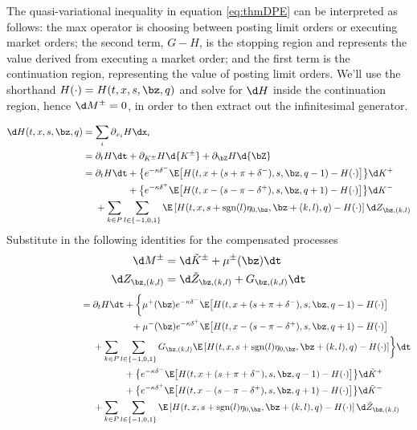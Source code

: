 \documentclass[12pt]{article}
\begin{document}
The quasi-variational inequality in equation \ref{eq:thmDPE} can be interpreted as follows: the max operator is choosing between posting limit orders or executing market orders; the second term, $G-H$, is the stopping region and represents the value derived from executing a market order; and the first term is the continuation region, representing the value of posting limit orders. We'll use the shorthand $H(\cdot) = H(t,x,s,\bz,q)$ and solve for $\d H$ inside the continuation region, hence $\d M^{\pm} = 0$, in order to then extract out the infinitesimal generator.

\begin{align*}
\d H (t,x,s,\bz,q) & = \sum\limits_i \partial_{x_i} H \dx_i \\
& = \partial_t H \dt + \partial_{K^{\pm}} H \d {K^{\pm}} + \partial_{\bZ} H \d {\bZ} \\
& = \partial_t H \dt + \bigl\lbrace e^{ -\kappa \delta^{-}} \E \bigl[ H(t,x+(s+\pi+\delta^-),s,\bz,q-1) - H(\cdot) \bigr] \bigr\rbrace \d K^+\\
& \hphantom{{}={} \partial_t H \dt} + \bigl\lbrace e^{ -\kappa \delta^{+}} \E \bigl[ H(t,x-(s-\pi-\delta^+),s,\bz,q+1) - H(\cdot) \bigr] \bigr\rbrace \d K^-\\
& \hphantom{{}={}} + \sum_{k\in P} \sum_{l \in \{-1,0,1\}} \E \left[ H(t,x,s+\mathrm{sgn}(l)\eta_{0,\bz},\bz+(k,l),q) - H(\cdot) \right] \d Z_{\bz,(k,l)}
\end{align*}
Substitute in the following identities for the compensated processes
\begin{align*} 
\d M^{\pm} & = \d \tilde{K}^{\pm} + \mu^{\pm}(\bz) \dt \\
\d Z_{\bz,(k,l)}  & = \d \tilde{Z}_{\bz,(k,l)}  + G_{\bz,(k,l)} \dt 
\end{align*}
\begin{align*}
{}\phantom{\d H (t,x,s,\bz,q)} & = \partial_t H \dt + \biggl\lbrace \mu^+(\bz) e^{ -\kappa \delta^{-}} \E \bigl[ H(t,x+(s+\pi+\delta^-),s,\bz,q-1) - H(\cdot) \bigr] \\
& \hphantom{{}={} \partial_t H \dt +} + \mu^-(\bz) e^{ -\kappa \delta^{+}} \E \bigl[ H(t,x-(s-\pi-\delta^+),s,\bz,q+1) - H(\cdot) \bigr] \\
& \hphantom{{}={}} + \sum_{k\in P} \sum_{l \in \{-1,0,1\}} G_{\bz,(k,l)} \E \left[ H(t,x,s+\mathrm{sgn}(l)\eta_{0,\bz},\bz+(k,l),q) - H(\cdot) \right]  \biggr\rbrace \dt \\
& \hphantom{{}={} \partial_t H \dt} + \bigl\lbrace e^{ -\kappa \delta^{-}} \E \bigl[ H(t,x+(s+\pi+\delta^-),s,\bz,q-1) - H(\cdot) \bigr] \bigr\rbrace \d \tilde{K}^+\\
& \hphantom{{}={} \partial_t H \dt} + \bigl\lbrace e^{ -\kappa \delta^{+}} \E \bigl[ H(t,x-(s-\pi-\delta^+),s,\bz,q+1) - H(\cdot) \bigr] \bigr\rbrace \d \tilde{K}^-\\
& \hphantom{{}={}} + \sum_{k\in P} \sum_{l \in \{-1,0,1\}} \E \left[ H(t,x,s+\mathrm{sgn}(l)\eta_{0,\bz},\bz+(k,l),q) - H(\cdot) \right] \d \tilde{Z}_{\bz,(k,l)}\
\end{align*}
\end{document}
